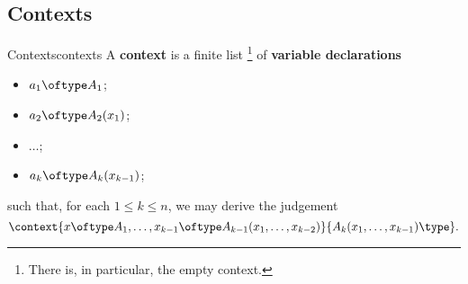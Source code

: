 \subsection{Contexts}\label{subsection-contexts}
\begin{definition}{Contexts}{contexts}%
    A \textbf{context} is a finite list%
    \footnote{%
        There is, in particular, the empty context.
        \par\vspace*{\TCBBoxCorrection}
    } %
    of \textbf{variable declarations}
    \begin{itemize}
        \item $a_{1}\oftype A_{1}$;
        \item $a_{2}\oftype A_{2}(x_{1})$;
        \item $\ldots$;
        \item $a_{k}\oftype A_{k}(x_{k-1})$;
    \end{itemize}
    such that, for each $1\leq k\leq n$, we may derive the judgement
    \[
        \context{x\oftype A_{1},\ldots,x_{k-1}\oftype A_{k-1}(x_{1},\ldots,x_{k-2})}{A_{k}(x_{1},\ldots,x_{k-1})\type}.%
    \]%
\end{definition}

